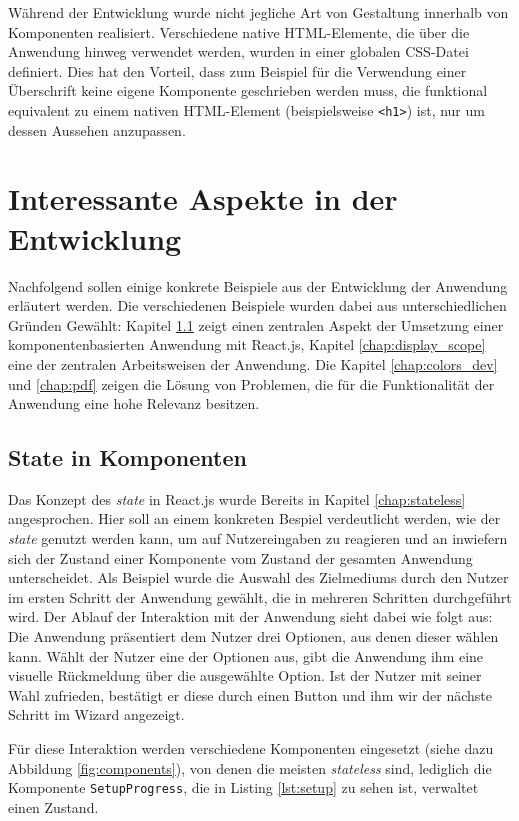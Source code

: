 Während der Entwicklung wurde nicht jegliche Art von Gestaltung innerhalb von Komponenten realisiert. Verschiedene native HTML-Elemente, die über die Anwendung hinweg verwendet werden, wurden in einer globalen CSS-Datei definiert. Dies hat den Vorteil, dass zum Beispiel für die Verwendung einer Überschrift keine eigene Komponente geschrieben werden muss, die funktional equivalent zu einem nativen HTML-Element (beispielsweise \verb|<h1>|) ist, nur um dessen Aussehen anzupassen.

\section{Interessante Aspekte in der Entwicklung}
Nachfolgend sollen einige konkrete Beispiele aus der Entwicklung der Anwendung erläutert werden. Die verschiedenen Beispiele wurden dabei aus unterschiedlichen Gründen Gewählt:
Kapitel \ref{chap:state_component} zeigt einen zentralen Aspekt der Umsetzung einer komponentenbasierten Anwendung mit React.js, Kapitel \ref{chap:display_scope} eine der zentralen Arbeitsweisen der Anwendung. Die Kapitel \ref{chap:colors_dev} und \ref{chap:pdf} zeigen die Lösung von Problemen, die für die Funktionalität der Anwendung eine hohe Relevanz besitzen.


\subsection{State in Komponenten}
\label{chap:state_component}
Das Konzept des \textit{state} in React.js wurde Bereits in Kapitel \ref{chap:stateless} angesprochen. Hier soll an einem konkreten Bespiel verdeutlicht werden, wie der \textit{state} genutzt werden kann, um auf Nutzereingaben zu reagieren und an inwiefern sich der Zustand einer Komponente vom Zustand der gesamten Anwendung unterscheidet.
Als Beispiel wurde die Auswahl des Zielmediums durch den Nutzer im ersten Schritt der Anwendung gewählt, die in mehreren Schritten durchgeführt wird.
Der Ablauf der Interaktion mit der Anwendung sieht dabei wie folgt aus:
Die Anwendung präsentiert dem Nutzer drei Optionen, aus denen dieser wählen kann. Wählt der Nutzer eine der Optionen aus, gibt die Anwendung ihm eine visuelle Rückmeldung über die ausgewählte Option. Ist der Nutzer mit seiner Wahl zufrieden, bestätigt er diese durch einen Button und  ihm wir der nächste Schritt im Wizard angezeigt.

Für diese Interaktion werden verschiedene Komponenten eingesetzt (siehe dazu Abbildung \ref{fig:components}), von denen die meisten \textit{stateless} sind, lediglich die Komponente \verb|SetupProgress|, die in Listing \ref{lst:setup} zu sehen ist\footnotemark{}, verwaltet einen Zustand.

